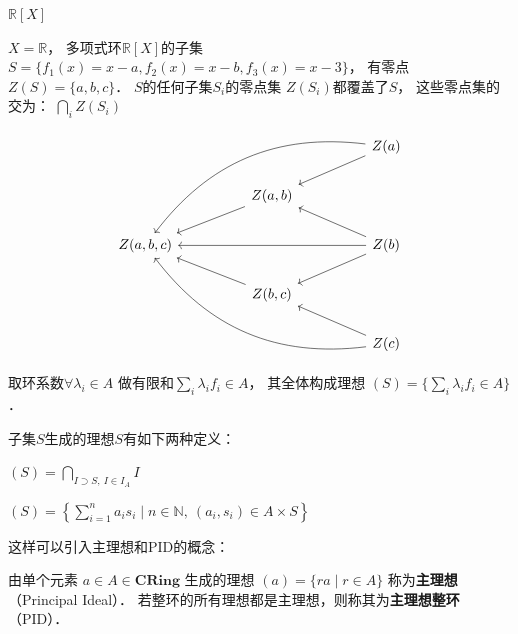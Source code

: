 \begin{example}{$\mathbb R[X]$}

$X = \mathbb R$，
多项式环$\mathbb R[X]$的子集
$S=\{ f_1(x) = x - a, f_2(x) = x - b, f_3(x) = x-3 \}$，
有零点$Z(S) = \{ a, b, c\}$．
$S$的任何子集$S_i$的零点集
$Z(S_i)$都覆盖了$S$，
这些零点集的交为：
$\bigcap\limits_i Z(S_i)$

$$
\begin{tikzcd}
           &  &                      &  & Z(a) \arrow[lld] \arrow[lllldd, bend right] \\
           &  & {Z(a,b)} \arrow[lld] &  &                                             \\
{Z(a,b,c)} &  &                      &  & Z(b) \arrow[llu] \arrow[lld] \arrow[llll]   \\
           &  & {Z(b,c)} \arrow[llu] &  &                                             \\
           &  &                      &  & Z(c) \arrow[llu] \arrow[lllluu, bend left] 
\end{tikzcd}
$$

取环系数$\forall \lambda_i \in A$
做有限和$\sum_i \lambda_i f_i \in A$，
其全体构成理想
$(S) = \{ \sum_i \lambda_i f_i \in A \}$．

\end{example}

子集$S$生成的理想$S$有如下两种定义：

\begin{framed}
\noindent
$(S) = \bigcap\limits_{I \supset S,\ I \in I_A} I$
\end{framed}

\begin{framed}
\noindent
$(S) = \left\{ \sum_{i=1}^n a_is_i \mid n \in \mathbb N,\ (a_i,s_i) \in A \times S \right\}$
\end{framed}

这样可以引入主理想和PID的概念：

\begin{framed}
\noindent
由单个元素 $a \in A \in \textbf{CRing}$ 生成的理想 $(a) = \{ra \mid r \in A\}$ 称为\textbf{主理想}（Principal Ideal）．
若整环的所有理想都是主理想，则称其为\textbf{主理想整环}（PID）．
\end{framed}

